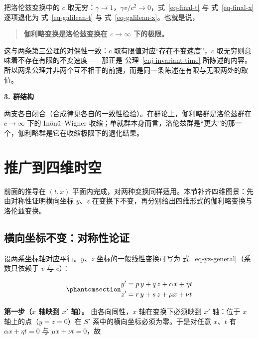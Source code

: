 \documentclass[
  chinese,
  a4paper,
  UTF8,
  12pt,
  oneside,
  openany]{ctexbook}
\theoremstyle{plain}
\theoremstyle{plain}
\theoremstyle{plain}
\theoremstyle{definition}
\theoremstyle{plain}
\theoremstyle{plain}
\theoremstyle{remark}
\begin{document}
把洛伦兹变换中的 \(c\)
取无穷：\(\gamma \to 1\)，\(\gamma v/c^{2} \to 0\)，式~\ref{eq-final-t}
与 式~\ref{eq-final-x} 逐项退化为 式~\ref{eq-galilean-t} 与
式~\ref{eq-galilean-x}。也就是说，

\begin{quote}
\textbf{伽利略变换是洛伦兹变换在 \(c \to \infty\) 下的极限。}
\end{quote}

这与两条第三公理的对偶性一致：\(c\) 取有限值对应``存在不变速度''，\(c\)
取无穷则意味着不存在有限的不变速度------那正是
公理~\ref{cnj-invariant-time}
所陈述的内容。所以两条公理并非两个互不相干的前提，而是同一条陈述在有限与无限两处的取值。

\textbf{3. 群结构}

两支各自闭合（合成律见各自的一致性检验）。在群论上，伽利略群是洛伦兹群在
\(c \to \infty\) 下的 Inönü--Wigner
收缩；单就群本身而言，洛伦兹群是``更大''的那一个，伽利略群是它在收缩极限下的退化结果。

\section{推广到四维时空}\label{sec-lorentz-4d}

前面的推导在 \((t, x)\)
平面内完成，对两种变换同样适用。本节补齐四维图景：先由对称性证明横向坐标
\(y\)、\(z\) 在变换下不变，再分别给出四维形式的伽利略变换与洛伦兹变换。

\subsection{横向坐标不变：对称性论证}\label{ux6a2aux5411ux5750ux6807ux4e0dux53d8ux5bf9ux79f0ux6027ux8bbaux8bc1}

设两系坐标轴对应平行。\(y\)、\(z\) 坐标的一般线性变换可写为
式~\ref{eq-yz-general}（系数只依赖于 \(v\) 与 \(c\)）：

\begin{equation}\protect\phantomsection\label{eq-yz-general}{
\begin{aligned}
y' &= p\,y + q\,z + \alpha x + \eta t \\
z' &= r\,y + s\,z + \mu x + \nu t
\end{aligned}
}\end{equation}

\textbf{第一步（\(x\) 轴映到 \(x'\) 轴）。} 由各向同性，\(x\)
轴在变换下必须映到 \(x'\) 轴：位于 \(x\) 轴上的点（\(y = z = 0\)）在
\(S'\) 系中的横向坐标必须为零。于是对任意 \(x\)、\(t\) 有
\(\alpha x + \eta t = 0\) 与 \(\mu x + \nu t = 0\)，故
\end{document}

